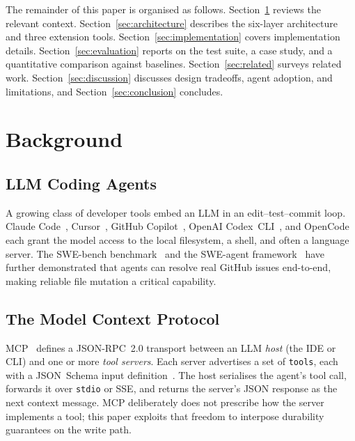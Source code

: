 \documentclass[11pt,twocolumn]{article}
\begin{document}
The remainder of this paper is organised as follows.
Section~\ref{sec:background} reviews the relevant context.
Section~\ref{sec:architecture} describes the six-layer architecture
and three extension tools.
Section~\ref{sec:implementation} covers implementation details.
Section~\ref{sec:evaluation} reports on the test suite, a case
study, and a quantitative comparison against baselines.
Section~\ref{sec:related} surveys related work.
Section~\ref{sec:discussion} discusses design tradeoffs, agent
adoption, and limitations, and Section~\ref{sec:conclusion}
concludes.

\section{Background}
\label{sec:background}

\subsection{LLM Coding Agents}

A growing class of developer tools embed an LLM in an
edit--test--commit loop.  Claude Code~\cite{claudecode2025},
Cursor~\cite{cursor2024}, GitHub Copilot~\cite{copilot2024},
OpenAI Codex~CLI~\cite{codex2025}, and
OpenCode~\cite{opencode2025} each grant the model access to the
local filesystem, a shell, and often a language server.  The
SWE-bench benchmark~\cite{jimenez2024swebench} and the SWE-agent
framework~\cite{yang2024sweagent} have further demonstrated that
agents can resolve real GitHub issues end-to-end, making reliable
file mutation a critical capability.

\subsection{The Model Context Protocol}

MCP~\cite{mcp2024} defines a JSON-RPC~2.0 transport between an LLM
\emph{host} (the IDE or CLI) and one or more \emph{tool servers}.
Each server advertises a set of \texttt{tools}, each with a
JSON~Schema input definition~\cite{jsonschema2020}.  The host
serialises the agent's tool call, forwards it over \texttt{stdio}
or SSE, and returns the server's JSON response as the next context
message.  MCP deliberately does not prescribe how the server
implements a tool; this paper exploits that freedom to interpose
durability guarantees on the write path.
\end{document}
